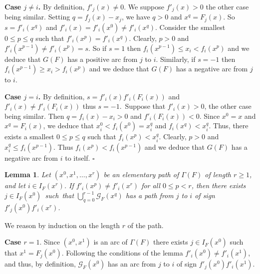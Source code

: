 \documentclass[11pt]{article}
\newtheorem{lemma}{Lemma}
\def\proof{\noindent{\bf Proof --~}}
\def\cqfd{\hfill$\square$}
\def\G{\mathscr{G}}
\begin{document}
\noindent
{\bf Case \boldmath$j\neq i$\unboldmath.} By definition, $f'_j(x)\neq
0$. We suppose $f'_j(x)>0$ the other case being similar. Setting
$q=f_j(x)-x_j$, we have $q>0$ and $x^q=F_j(x)$. So $s=f'_i(x^q)$ and
$f'_i(x)=f'_i(x^0)\neq f'_i(x^q)$. Consider the smallest $0\leq p\leq
q$ such that $f'_i(x^p)=f'_i(x^q)$. Clearly, $p>0$ and
$f'_i(x^{p-1})\neq f'_i(x^p)=s$. So if $s=1$ then $f_i(x^{p-1})\leq
x_i<f_i(x^p)$ and we deduce that $G(F)$ has a positive arc from $j$ to
$i$. Similarly, if $s=-1$ then $f_i(x^{p-1})\geq x_i>f_i(x^p)$ and we
deduce that $G(F)$ has a negative arc from $j$ to $i$.\bigskip

\noindent
{\bf Case \boldmath$j= i$\unboldmath.} By definition,
$s=f'_i(x)f'_i(F_i(x))$ and $f'_i(x)\neq f'_i(F_i(x))$ thus
$s=-1$.~Suppose that $f'_i(x)>0$, the other case being similar. Then
$q= f_i(x)-x_i>0$ and $f'_i(F_i(x))<0$. Since $x^0=x$ and
$x^q=F_i(x)$, we deduce that $x^0_i<f_i(x^0)=x^q_i$ and
$f_i(x^q)<x^q_i$. Thus, there exists a smallest $0\leq p\leq q$ such
that $f_i(x^p)< x^q_i$. Clearly, $p>0$ and $x^{q}_i\leq
f_i(x^{p-1})$. Thus $f_i(x^p)<f_i(x^{p-1})$ and we deduce that $G(F)$
has a negative arc from $i$ to itself.
\cqfd


\begin{lemma}\label{lem:path}
Let $(x^0,x^1,\dots,x^r)$ be an elementary path of $\Gamma(F)$ of
length $r\geq 1$, and let $i\in I_F(x^r)$. If $f'_i(x^p)\neq
f'_i(x^r)$ for all $0\leq p<r$, then there exists $j\in
I_F(x^0)$~such~that $\bigcup_{q=0}^{r-1} \G_F(x^q)$ has a path from
$j$ to $i$ of sign $f'_j(x^0)f'_i(x^r)$.
\end{lemma}

\proof 
We reason by induction on the length $r$ of the path.\bigskip

\noindent
{\bf Case \boldmath$r=1$\unboldmath}. Since $(x^0,x^1)$ is an arc of
$\Gamma(F)$ there exists $j\in I_F(x^0)$ such that
$x^1=F_j(x^0)$. Following the conditions of the lemma $f'_i(x^0)\neq
f'_i(x^1)$, and thus, by definition, $\G_F(x^0)$ has an arc from $j$
to $i$ of sign $f'_j(x^0)f'_i(x^1)$.\bigskip
	
\end{document}
